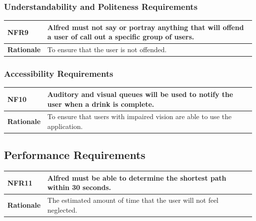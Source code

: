 \documentclass [11pt]{article}
\begin{document}
\subsubsection{Understandability and Politeness Requirements}

\begin{longtable}{| p{ } | p{ } | }\hline 
\rowcolor{tableCell}\textbf{NFR9} & Alfred must not say or portray anything that will offend a user of call out a specific group of users. \\ \hline
\textbf{Rationale} & To ensure that the user is not offended.\\ \hline 
\end{longtable}
\subsubsection{Accessibility Requirements }

\begin{longtable}{| p{ } | p{ } | }\hline 
\rowcolor{tableCell}\textbf{NF10} & Auditory and visual queues will be used to notify the user when a drink is complete. \\ \hline
\textbf{Rationale} & To ensure that users with impaired vision are able to use the application.\\ \hline 
\end{longtable}


\subsection{Performance Requirements}

\begin{longtable}{| p{ } | p{ } | }\hline 
\rowcolor{tableCell}\textbf{NFR11} & Alfred must be able to determine the shortest path within 30 seconds. \\ \hline
\textbf{Rationale} & The estimated amount of time that the user will not feel neglected.\\ \hline 
\end{longtable}


\pagebreak
\end{document}

